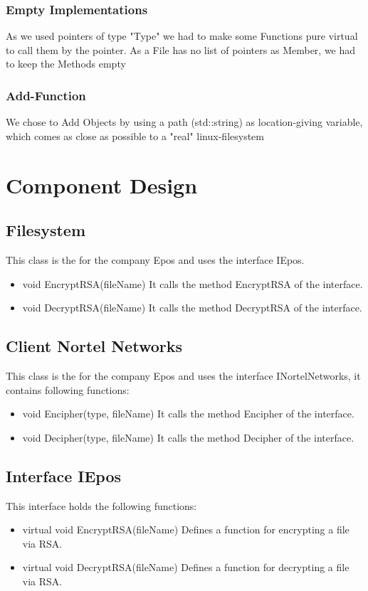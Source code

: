 \subsubsection{Empty Implementations}
As we used pointers of type "Type" we had to make some Functions pure virtual to call them by the pointer. As a File has no list of pointers as Member, we had to keep the Methods empty

\subsubsection{Add-Function}
We chose to Add Objects by using a path (std::string) as location-giving variable, which comes as close as possible to a "real" linux-filesystem


\section{Component Design}
\subsection{Filesystem}
This class is the for the company Epos and uses the interface IEpos.
\begin{itemize}
\item void EncryptRSA(fileName)
\subitem It calls the method EncryptRSA of the interface.
\item void DecryptRSA(fileName)
\subitem It calls the method DecryptRSA of the interface.
\end{itemize}

\subsection{Client Nortel Networks}
This class is the for the company Epos and uses the interface INortelNetworks, it contains following functions:
\begin{itemize}
\item void Encipher(type, fileName)
\subitem It calls the method Encipher of the interface.
\item void Decipher(type, fileName)
\subitem It calls the method Decipher of the interface.
\end{itemize}

\subsection{Interface IEpos}
This interface holds the following functions:
\begin{itemize}
\item virtual  void EncryptRSA(fileName)
\subitem Defines a function for encrypting a file via RSA.
\item virtual void DecryptRSA(fileName)
\subitem Defines a function for decrypting a file via RSA.
\end{itemize}

